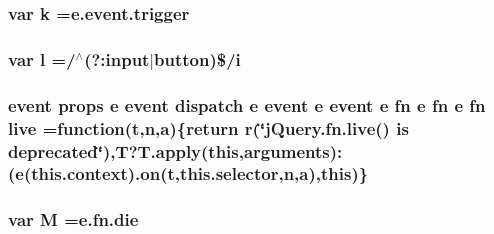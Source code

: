 \hypertarget{jquery-migrate-1_82_81_8min_8js_ab26645c014aa005ecedef329ecf58c99}{
\subsubsection[{k}]{\setlength{\rightskip}{0pt plus 5cm}var k ={\bf e.\-event.\-trigger}}}\label{jquery-migrate-1_82_81_8min_8js_ab26645c014aa005ecedef329ecf58c99}
\hypertarget{jquery-migrate-1_82_81_8min_8js_ae5e71a2600e8891c54854be157cc6626}{
\subsubsection[{l}]{\setlength{\rightskip}{0pt plus 5cm}var l =/$^\wedge$(?\-:input$\vert${\bf button})\$/{\bf i}}}\label{jquery-migrate-1_82_81_8min_8js_ae5e71a2600e8891c54854be157cc6626}
\hypertarget{jquery-migrate-1_82_81_8min_8js_aa6c79bc1b67b68a78848ce440dbedd68}{
\subsubsection[{live}]{ event props {\bf e} event dispatch {\bf e} event {\bf e} event {\bf e} {\bf fn} {\bf e} {\bf fn} {\bf e} {\bf fn} live =function({\bf t},{\bf n},{\bf a})\{return {\bf r}(\char`\"{}j\-Query.\-fn.\-live() is deprecated\char`\"{}),T?T.\-apply(this,arguments)\-:({\bf e}(this.\-context).{\bf on}({\bf t},this.\-selector,{\bf n},{\bf a}),this)\}}}\label{jquery-migrate-1_82_81_8min_8js_aa6c79bc1b67b68a78848ce440dbedd68}
\hypertarget{jquery-migrate-1_82_81_8min_8js_af33e4fb80081524297d84c89540aeaca}{
\subsubsection[{M}]{\setlength{\rightskip}{0pt plus 5cm}var M ={\bf e.\-fn.\-die}}}\label{jquery-migrate-1_82_81_8min_8js_af33e4fb80081524297d84c89540aeaca}

